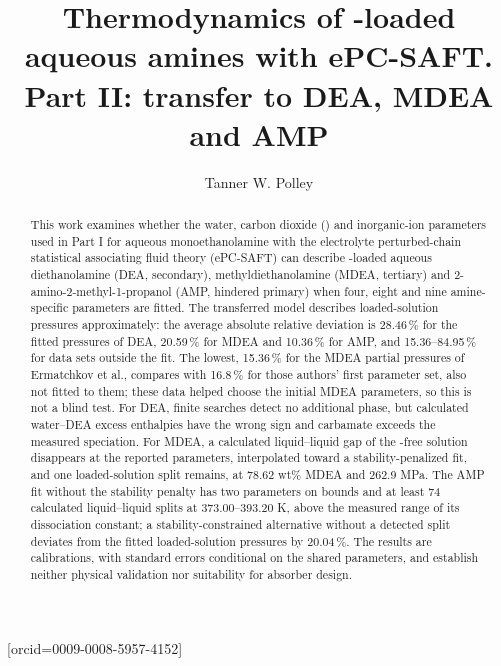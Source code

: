 \documentclass[a4paper,fleqn]{cas-sc}
\begin{document}
\let\WriteBookmarks\relax
\def\floatpagepagefraction{1}
\def\textpagefraction{.001}
\title[mode=title]{\texorpdfstring{Thermodynamics of -loaded aqueous amines with ePC-SAFT. Part II: transfer to DEA, MDEA and AMP}{Thermodynamics of CO2-loaded aqueous amines with ePC-SAFT. Part II: transfer to DEA, MDEA and AMP}}
\author[1]{Tanner W. Polley}[orcid=0009-0008-5957-4152]
\cormark[1]
\begin{abstract}
This work examines whether the water, carbon dioxide () and inorganic-ion parameters used in Part I for aqueous monoethanolamine with the electrolyte perturbed-chain statistical associating fluid theory (ePC-SAFT) can describe -loaded aqueous diethanolamine (DEA, secondary), methyldiethanolamine (MDEA, tertiary) and 2-amino-2-methyl-1-propanol (AMP, hindered primary) when four, eight and nine amine-specific parameters are fitted.
The transferred model describes loaded-solution pressures approximately: the average absolute relative deviation is 28.46\,\% for the fitted pressures of DEA, 20.59\,\% for MDEA and 10.36\,\% for AMP, and 15.36--84.95\,\% for data sets outside the fit.
The lowest, 15.36\,\% for the MDEA partial pressures of Ermatchkov et al., compares with 16.8\,\% for those authors' first parameter set, also not fitted to them; these data helped choose the initial MDEA parameters, so this is not a blind test.
For DEA, finite searches detect no additional phase, but calculated water--DEA excess enthalpies have the wrong sign and carbamate exceeds the measured speciation.
For MDEA, a calculated liquid--liquid gap of the -free solution disappears at the reported parameters, interpolated toward a stability-penalized fit, and one loaded-solution split remains, at 78.62 wt\% MDEA and 262.9 MPa.
The AMP fit without the stability penalty has two parameters on bounds and at least 74 calculated liquid--liquid splits at 373.00--393.20 K, above the measured range of its dissociation constant; a stability-constrained alternative without a detected split deviates from the fitted loaded-solution pressures by 20.04\,\%.
The results are calibrations, with standard errors conditional on the shared parameters, and establish neither physical validation nor suitability for absorber design.
\end{abstract}
\end{document}
